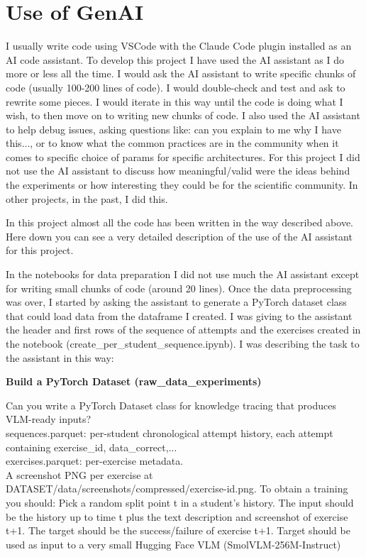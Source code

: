 \documentclass[10pt]{article}
\begin{document}
\section*{Use of GenAI}
I usually write code using VSCode with the Claude Code plugin installed as an AI code assistant.
To develop this project I have used the AI assistant as I do more or less all the time.
I would ask the AI assistant to write specific chunks of code (usually 100-200 lines of code).
I would double-check and test and ask to rewrite some pieces.
I would iterate in this way until the code is doing what I wish, to then move on to writing new chunks of code.
I also used the AI assistant to help debug issues, asking questions like: can you explain to me why I have this..., or
to know what the common practices are in the community when it comes to specific choice of params for specific architectures.
For this project I did not use the AI assistant to discuss how meaningful/valid were the ideas behind the experiments or how interesting
they could be for the scientific community. In other projects, in the past, I did this.

In this project almost all the code has been written in the way described above.
Here down you can see a very detailed description of the use of the AI assistant for this project.

In the notebooks for data preparation I did not use much the AI assistant except for writing small chunks of code (around 20 lines).
Once the data preprocessing was over, I started by asking the assistant to generate a PyTorch dataset class that could load data from the dataframe I created.
I was giving to the assistant the header and first rows of the sequence of attempts and the exercises created in the notebook (create\_per\_student\_sequence.ipynb).
I was describing the task to the assistant in this way:

\medskip\noindent\textbf{Build a PyTorch Dataset (raw\_data\_experiments)}
\begin{itshape}
Can you write a PyTorch Dataset class for knowledge tracing that produces VLM-ready inputs?\\
sequences.parquet: per-student chronological attempt history, each attempt containing exercise\_id, data\_correct,...\\
exercises.parquet:  per-exercise metadata.\\
A screenshot PNG per exercise at DATASET/data/screenshots/compressed/exercise-id.png.
To obtain a training you should:
Pick a random split point t in a student's history.
The input should be the history up to time t plus the text description and screenshot of exercise t+1.
The target should be the success/failure of exercise t+1.
Target should be used as input to a very small Hugging Face VLM (SmolVLM-256M-Instruct)\end{itshape}
\end{document}
